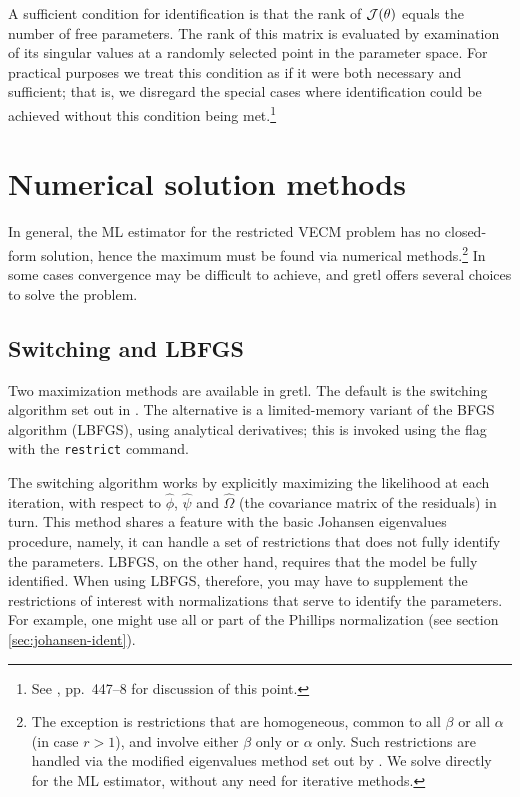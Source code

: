 A sufficient condition for identification is that the rank of ${\cal
  J}(\theta)$ equals the number of free parameters.  The rank of this
matrix is evaluated by examination of its singular values at a
randomly selected point in the parameter space.  For practical
purposes we treat this condition as if it were both necessary and
sufficient; that is, we disregard the special cases where
identification could be achieved without this condition being
met.\footnote{See \cite{boswijk-doornik04}, pp.\ 447--8 for
  discussion of this point.}


\section{Numerical solution methods}
\label{sec:vecm-opt}

In general, the ML estimator for the restricted VECM problem has no
closed-form solution, hence the maximum must be found via numerical
methods.\footnote{The exception is restrictions that are homogeneous,
common to all $\beta$ or all $\alpha$ (in case $r>1$), and involve
either $\beta$ only or $\alpha$ only.  Such restrictions are handled
via the modified eigenvalues method set out by \cite{johansen95}.  We
solve directly for the ML estimator, without any need for iterative
methods.}  In some cases convergence may be difficult to achieve, and
gretl offers several choices to solve the problem.

\subsection{Switching and LBFGS}
\label{sec:vecm-algorithms}

Two maximization methods are available in gretl. The default is the
switching algorithm set out in \cite{boswijk-doornik04}.  The
alternative is a limited-memory variant of the BFGS algorithm (LBFGS),
using analytical derivatives; this is invoked using the 
flag with the \texttt{restrict} command.

The switching algorithm works by explicitly maximizing the likelihood
at each iteration, with respect to $\hat{\phi}$, $\hat{\psi}$ and
$\hat{\Omega}$ (the covariance matrix of the residuals) in turn.  This
method shares a feature with the basic Johansen eigenvalues procedure,
namely, it can handle a set of restrictions that does not fully
identify the parameters.  LBFGS, on the other hand, requires that the
model be fully identified.  When using LBFGS, therefore, you may have
to supplement the restrictions of interest with normalizations that
serve to identify the parameters.  For example, one might use all or
part of the Phillips normalization (see section
\ref{sec:johansen-ident}).


